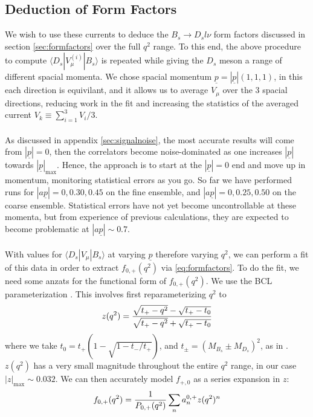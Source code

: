 \documentclass[a4paper,10pt]{article}
\numberwithin{equation}{section}
\begin{document}
\subsection{Deduction of Form Factors}

We wish to use these currents to deduce the $B_s\to D_s l\nu$ form factors discussed in section \ref{sec:formfactors} over the full $q^2$ range. To this end, the above procedure to compute $\langle D_s | V^{(i)}_{\mu} | B_s \rangle$ is repeated while giving the $D_s$ meson a range of different spacial momenta. We chose spacial momentum $\underline{p} = |\underline{p}|(1,1,1)$, in this each direction is equivilant, and it allows us to average $V_{\mu}$ over the 3 spacial directions, reducing work in the fit and increasing the statistics of the averaged current $V_k \equiv \sum_{i=1}^3 V_i / 3$.
\\ \\
As discussed in appendix \ref{sec:signalnoise}, the most accurate results will come from $|\underline{p}| = 0$, then the correlators become noise-dominated as one increases $|\underline{p}|$ towards $|\underline{p}|_{\text{max}}$. Hence, the approach is to start at the $|\underline{p}|=0$ end and move up in momentum, monitoring statistical errors as you go. So far we have performed runs for $|a\underline{p}| = 0,0.30,0.45$ on the fine ensemble, and $|a\underline{p}|=0,0.25,0.50$ on the coarse ensemble. Statistical errors have not yet become uncontrollable at these momenta, but from experience of previous calculations, they are expected to become problematic at $|a\underline{p}| \sim 0.7$. 
\\ \\
With values for $\langle D_s | V_{\mu} | B_s \rangle$ at varying $\underline{p}$ therefore varying $q^2$, we can perform a fit of this data in order to extract $f_{0,+}(q^2)$ via \eqref{eq:formfactors}. To do the fit, we need some anzats for the functional form of $f_{0,+}(q^2)$. We use the BCL parameterization \cite{PhysRevD.79.013008}. This involves first reparameterizing $q^2$ to 
\begin{align}
	z(q^2) = {\sqrt{t_+ - q^2} - \sqrt{t_+ - t_0} \over \sqrt{t_+ - q^2} + \sqrt{t_+ - t_0} }
\end{align}
where we take $t_0 = t_+( 1 - \sqrt{1 - t_-/t_+})$, and $t_{\pm} = (M_{B_s} \pm M_{D_s})^2$, as in \cite{Hill:2006ub}. $z(q^2)$ has a very small magnitude throughout the entire $q^2$ range, in our case $|z|_{\text{max}} \sim 0.032$. We can then accurately model $f_{+,0}$ as a series expansion in $z$:
\begin{align}
	f_{0,+}(q^2) = {1\over P_{0,+}(q^2)} \sum_n a^{0,+}_n z(q^2)^n
	\label{eq:zexpansion}
\end{align}
\end{document}
